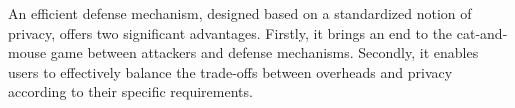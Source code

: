 An efficient defense mechanism, designed based on a standardized notion of privacy, offers two significant advantages. Firstly, it brings an end to the cat-and-mouse game between attackers and defense mechanisms. Secondly, it enables users to effectively balance the trade-offs between overheads and privacy according to their specific requirements.  







